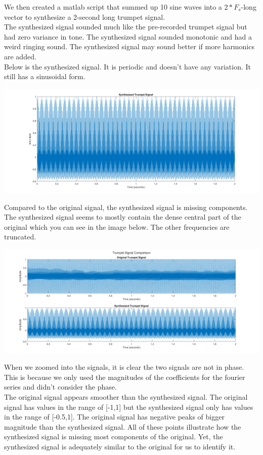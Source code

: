 \documentclass[11pt]{article}
\begin{document}
We then created a matlab script that summed up 10 sine waves into a $2*F_s$-long vector to synthesize a 2-second long trumpet signal.\\

The synthesized signal sounded much like the pre-recorded trumpet signal
but had zero variance in tone.
The synthesized signal sounded monotonic and had a weird ringing sound.
The synthesized signal may sound better if more harmonics are added.\\

Below is the synthesized signal. It is periodic and doesn't have any variation.
It still has a sinusoidal form.

\includegraphics[width=\textwidth]{signal_synthesis.png}

Compared to the original signal, the synthesized signal is missing components.
The synthesized signal seems to mostly contain the dense central part of the original
which you can see in the image below. The other frequencies are truncated.

\includegraphics[width=\textwidth]{trumpet_signal_comparison.png}

When we zoomed into the signals, it is clear the two signals are not in phase.
This is because we only used the magnitudes of the coefficients for the fourier series
and didn't consider the phase.\\

The original signal appears smoother than the synthesized signal.
The original signal has values in the range of [-1,1] 
but the synthesized signal only has values in the range of [-0.5,1]. 
The original signal has negative peaks of bigger magnitude than the synthesized signal.
All of these points illustrate how the synthesized signal is missing most components of 
the original. Yet, the synthesized signal is adequately similar to the original for
us to identify it.
\end{document}
